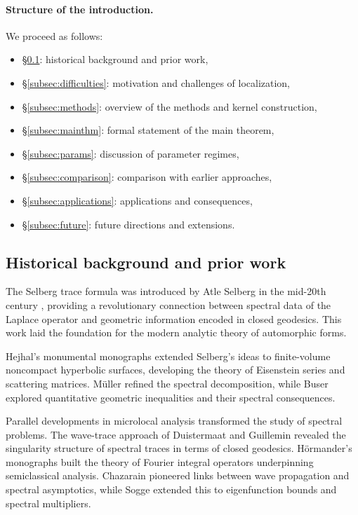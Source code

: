 \paragraph{Structure of the introduction.}
We proceed as follows:
\begin{itemize}
  \item \S\ref{subsec:history}: historical background and prior work,
  \item \S\ref{subsec:difficulties}: motivation and challenges of localization,
  \item \S\ref{subsec:methods}: overview of the methods and kernel construction,
  \item \S\ref{subsec:mainthm}: formal statement of the main theorem,
  \item \S\ref{subsec:params}: discussion of parameter regimes,
  \item \S\ref{subsec:comparison}: comparison with earlier approaches,
  \item \S\ref{subsec:applications}: applications and consequences,
  \item \S\ref{subsec:future}: future directions and extensions.
\end{itemize}

\subsection{Historical background and prior work}\label{subsec:history}

The Selberg trace formula was introduced by Atle Selberg in the mid-20th century
\cite{selberg1956}, providing a revolutionary connection between spectral data of the
Laplace operator and geometric information encoded in closed geodesics.  
This work laid the foundation for the modern analytic theory of automorphic forms.

Hejhal’s monumental monographs \cite{hejhal1976,hejhal1983} extended Selberg’s ideas to
finite-volume noncompact hyperbolic surfaces, developing the theory of Eisenstein series
and scattering matrices. Müller \cite{mueller1983} refined the spectral decomposition,
while Buser \cite{buser1992} explored quantitative geometric inequalities and their
spectral consequences.

Parallel developments in microlocal analysis transformed the study of spectral problems.
The wave-trace approach of Duistermaat and Guillemin
\cite{duistermaatguillemin1975} revealed the singularity structure of spectral traces in
terms of closed geodesics. Hörmander’s monographs
\cite{hormander1994III} built the theory of Fourier integral operators underpinning
semiclassical analysis. Chazarain \cite{chazarain1974} pioneered links between wave
propagation and spectral asymptotics, while Sogge
\cite{sogge1993,sogge2017} extended this to eigenfunction bounds and spectral multipliers.


